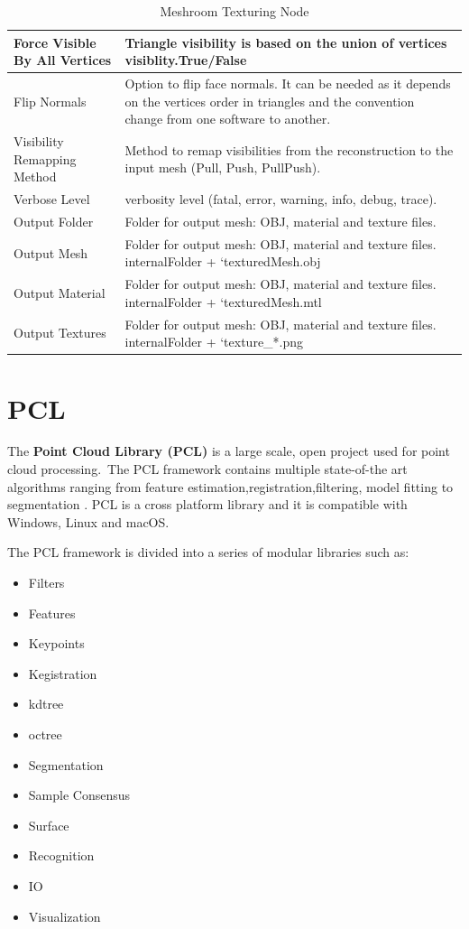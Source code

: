 \documentclass[12pt]{report}
\begin{document}
\begin{table}[h!]
{\begin{tabular}{|l|l|}
  Force Visible By All Vertices   & Triangle visibility is based on the union of vertices visiblity.True/False                     \\ \hline
  Flip Normals &
    Option to flip face normals. It can be needed as it depends on  the vertices order in triangles and the convention change from one  software to another. \\ \hline
  Visibility Remapping Method     & Method to remap visibilities from the reconstruction to the input mesh (Pull, Push, PullPush). \\ \hline
  Verbose Level                   & verbosity level (fatal, error, warning, info, debug, trace).                                   \\ \hline
  Output Folder                   & Folder for output mesh: OBJ, material and texture files.                                       \\ \hline
  Output Mesh                     & Folder for output mesh: OBJ, material and texture files. internalFolder + ‘texturedMesh.obj    \\ \hline
  Output Material                 & Folder for output mesh: OBJ, material and texture files. internalFolder + ‘texturedMesh.mtl    \\ \hline
  Output Textures                 & Folder for output mesh: OBJ, material and texture files. internalFolder + ‘texture\_*.png      \\ \hline
  \end{tabular}%
  }
  \caption{Meshroom Texturing Node}
  \label{tab:Texturing}
  \end{table}


\section{PCL}
The \textbf{Point Cloud Library (PCL)} is a large scale, open project used for point cloud processing.\
The PCL framework contains multiple state-of-the art algorithms ranging from feature estimation,registration,filtering, model fitting to segmentation . 
PCL is a cross platform library and it is compatible with Windows, Linux and macOS.

The PCL framework is divided into a series of modular libraries such as:
\begin{multicols}{2}
\begin{itemize}
  \item Filters
  \item Features
  \item Keypoints
  \item Kegistration
  \item kdtree
  \item octree
  \item Segmentation
  \item Sample Consensus
  \item Surface
  \item Recognition
  \item IO 
  \item Visualization
\end{itemize}
\end{multicols}
\end{document}
